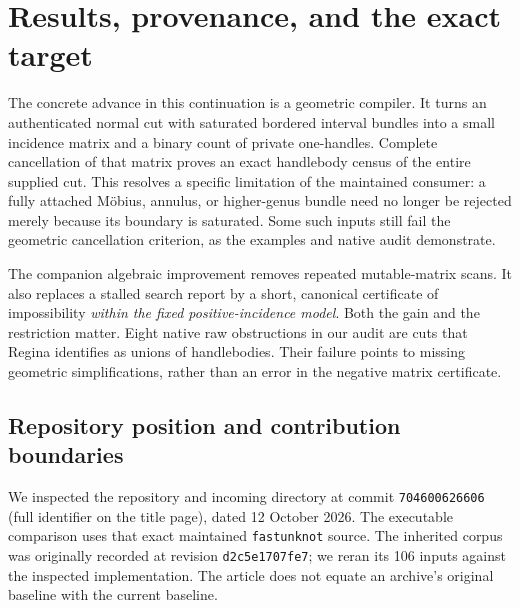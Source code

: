 \section{Results, provenance, and the exact target}
\label{sec:context}

The concrete advance in this continuation is a geometric compiler.  It
turns an authenticated normal cut with saturated bordered interval bundles
into a small incidence matrix and a binary count of private one-handles.
Complete cancellation of that matrix proves an exact handlebody census of
the entire supplied cut.  This resolves a specific limitation of the
maintained consumer: a fully attached M\"obius, annulus, or higher-genus
bundle need no longer be rejected merely because its boundary is saturated.
Some such inputs still fail the geometric cancellation criterion, as the
examples and native audit demonstrate.

The companion algebraic improvement removes repeated mutable-matrix scans.
It also replaces a stalled search report by a short, canonical certificate
of impossibility \emph{within the fixed positive-incidence model}.  Both
the gain and the restriction matter.  Eight native raw obstructions in our
audit are cuts that Regina identifies as unions of handlebodies.  Their
failure points to missing geometric simplifications, rather than an error
in the negative matrix certificate.

\subsection{Repository position and contribution boundaries}

We inspected the repository and incoming directory at commit
\texttt{704600626606} (full identifier on the title page),
dated 12 October 2026\cite{ProveItPinned}.  The executable comparison uses
that exact maintained \texttt{fastunknot} source.  The inherited corpus was
originally recorded at revision
\texttt{d2c5e1707fe7};
we reran its 106 inputs against the inspected implementation.  The article
does not equate an archive's original baseline with the current baseline.

